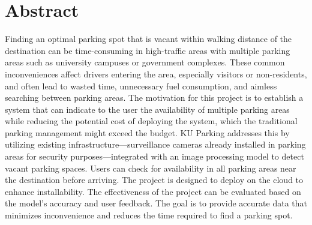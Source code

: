 \chapter*{Abstract}
\label{chap:abstract}

Finding an optimal parking spot that is vacant within walking distance of the destination can be time-consuming in high-traffic areas with multiple parking areas such as university campuses or government complexes.
These common inconveniences affect drivers entering the area, especially visitors or non-residents, and often lead to wasted time, unnecessary fuel consumption, and aimless searching between parking areas.
The motivation for this project is to establish a system that can indicate to the user the availability of multiple parking areas while reducing the potential cost of deploying the system, which the traditional parking management might exceed the budget. 
KU Parking addresses this by utilizing existing infrastructure—surveillance cameras already installed in parking areas for security purposes—integrated with an image processing model to detect vacant parking spaces.
Users can check for availability in all parking areas near the destination before arriving.
The project is designed to deploy on the cloud to enhance installability. 
The effectiveness of the project can be evaluated based on the model's accuracy and user feedback.
The goal is to provide accurate data that minimizes inconvenience and reduces the time required to find a parking spot.